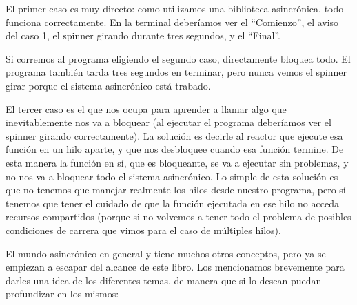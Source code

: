 El primer caso es muy directo: como utilizamos una biblioteca asincrónica, todo funciona correctamente. En la terminal deberíamos ver el ``Comienzo'', el aviso del caso 1, el spinner girando durante tres segundos, y el ``Final''.

Si corremos al programa eligiendo el segundo caso, directamente bloquea todo. El programa también tarda tres segundos en terminar, pero nunca vemos el spinner girar porque el sistema asincrónico está trabado.

El tercer caso es el que nos ocupa para aprender a llamar algo que inevitablemente nos va a bloquear (al ejecutar el programa deberíamos ver el spinner girando correctamente). La solución es decirle al reactor que ejecute esa función en un hilo aparte, y que nos desbloquee cuando esa función termine. De esta manera la función en sí, que es bloqueante, se va a ejecutar sin problemas, y no nos va a bloquear todo el sistema asincrónico. Lo simple de esta solución es que no tenemos que manejar realmente los hilos desde nuestro programa, pero sí tenemos que tener el cuidado de que la función ejecutada en ese hilo no acceda recursos compartidos (porque si no volvemos a tener todo el problema de posibles condiciones de carrera que vimos para el caso de múltiples hilos).

El mundo asincrónico en general y  tiene muchos otros conceptos, pero ya se empiezan a escapar del alcance de este libro. Los mencionamos brevemente para darles una idea de los diferentes temas, de manera que si lo desean puedan profundizar en los mismos:


